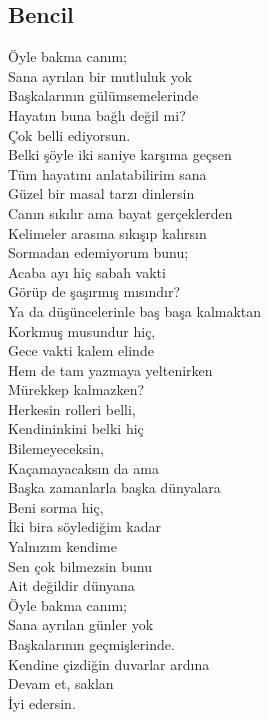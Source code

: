 \subsection{Bencil}

Öyle bakma canım; \\
Sana ayrılan bir mutluluk yok \\
Başkalarının gülümsemelerinde \\
Hayatın buna bağlı değil mi? \\
Çok belli ediyorsun. \\

\noindent\newline
Belki şöyle iki saniye karşıma geçsen \\
Tüm hayatını anlatabilirim sana \\
Güzel bir masal tarzı dinlersin \\
Canın sıkılır ama bayat gerçeklerden \\
Kelimeler arasına sıkışıp kalırsın \\

\noindent\newline
Sormadan edemiyorum bunu; \\
Acaba ayı hiç sabah vakti \\
Görüp de şaşırmış mısındır? \\
Ya da düşüncelerinle baş başa kalmaktan \\
Korkmuş musundur hiç, \\
Gece vakti kalem elinde \\
Hem de tam yazmaya yeltenirken \\
Mürekkep kalmazken? \\

\noindent\newline
Herkesin rolleri belli, \\
Kendininkini belki hiç \\
Bilemeyeceksin, \\
Kaçamayacaksın da ama \\
Başka zamanlarla başka dünyalara \\

\noindent\newline
Beni sorma hiç, \\
İki bira söylediğim kadar \\
Yalnızım kendime \\
Sen çok bilmezsin bunu \\
Ait değildir dünyana \\

\noindent\newline
Öyle bakma canım; \\
Sana ayrılan günler yok \\
Başkalarının geçmişlerinde. \\
Kendine çizdiğin duvarlar ardına \\
Devam et, saklan \\
İyi edersin. \\